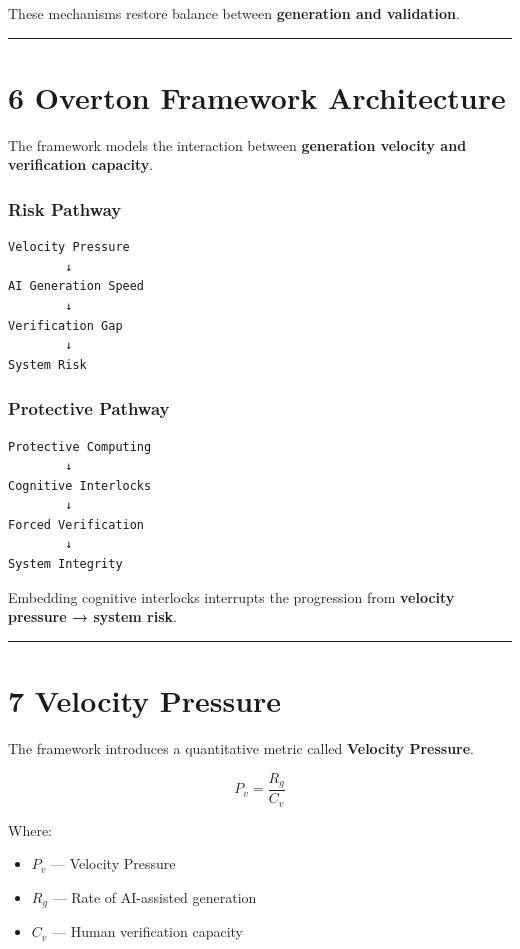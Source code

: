 \documentclass[
]{article}
\providecommand{\tightlist}{%
  \setlength{\itemsep}{0pt}\setlength{\parskip}{0pt}}
\begin{document}
These mechanisms restore balance between \textbf{generation and
validation}.

\begin{center}\rule{0.5\linewidth}{0.5pt}\end{center}

\section{6 Overton Framework
Architecture}\label{6-overton-framework-architecture}

The framework models the interaction between \textbf{generation velocity
and verification capacity}.

\subsubsection{Risk Pathway}\label{risk-pathway}

\begin{verbatim}
Velocity Pressure
        ↓
AI Generation Speed
        ↓
Verification Gap
        ↓
System Risk
\end{verbatim}

\subsubsection{Protective Pathway}\label{protective-pathway}

\begin{verbatim}
Protective Computing
        ↓
Cognitive Interlocks
        ↓
Forced Verification
        ↓
System Integrity
\end{verbatim}

Embedding cognitive interlocks interrupts the progression from
\textbf{velocity pressure → system risk}.

\begin{center}\rule{0.5\linewidth}{0.5pt}\end{center}

\section{7 Velocity Pressure}\label{7-velocity-pressure}

The framework introduces a quantitative metric called \textbf{Velocity
Pressure}.

\[
P_v = \frac{R_g}{C_v}
\]

Where:

\begin{itemize}
\tightlist
\item
  \textbf{\(P_v\)} --- Velocity Pressure
\item
  \textbf{\(R_g\)} --- Rate of AI-assisted generation
\item
  \textbf{\(C_v\)} --- Human verification capacity
\end{itemize}
\end{document}
